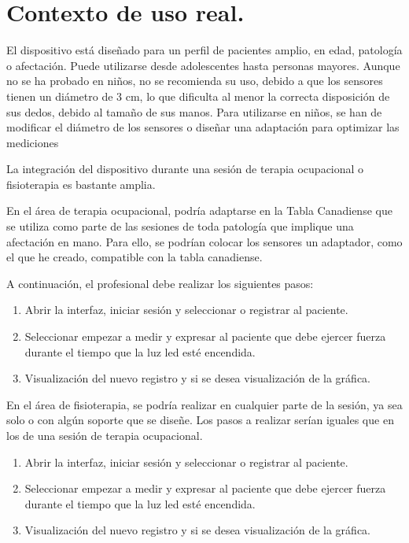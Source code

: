 \section{Contexto de uso real.}
El dispositivo está diseñado para un perfil de pacientes amplio, en edad, patología o afectación. Puede utilizarse desde adolescentes hasta personas mayores. Aunque no se ha probado en niños, no se recomienda su uso, debido a que los sensores tienen un diámetro de 3 cm, lo que dificulta al menor la correcta disposición de sus dedos, debido al tamaño de sus manos. Para utilizarse en niños, se han de modificar el diámetro de los sensores o diseñar una adaptación para optimizar las mediciones

La integración del dispositivo durante una sesión de terapia ocupacional o fisioterapia es bastante amplia.

En el área de terapia ocupacional, podría adaptarse en la Tabla Canadiense que se utiliza como parte de las sesiones de toda patología que implique una afectación en mano. Para ello, se podrían colocar los sensores un adaptador, como el que he creado, compatible con la tabla canadiense. 

A continuación, el profesional debe realizar los siguientes pasos: 
\begin{enumerate}
    \item Abrir la interfaz, iniciar sesión y seleccionar o registrar al paciente.
    \item Seleccionar empezar a medir y expresar al paciente que debe ejercer fuerza durante el tiempo que la luz led esté encendida.
    \item Visualización del nuevo registro y si se desea visualización de la gráfica. 
\end{enumerate}

En el área de fisioterapia, se podría realizar en cualquier parte de la sesión, ya sea solo o con algún soporte que se diseñe. Los pasos a realizar serían iguales que en los de una sesión de terapia ocupacional. 
\begin{enumerate}
    \item Abrir la interfaz, iniciar sesión y seleccionar o registrar al paciente.
    \item Seleccionar empezar a medir y expresar al paciente que debe ejercer fuerza durante el tiempo que la luz led esté encendida.
    \item Visualización del nuevo registro y si se desea visualización de la gráfica. 
\end{enumerate}


